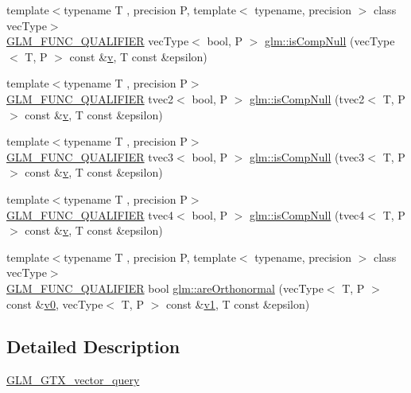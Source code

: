 \begin{DoxyCompactItemize}
\item 
{\footnotesize template$<$typename T , precision P, template$<$ typename, precision $>$ class vec\+Type$>$ }\\\mbox{\hyperlink{setup_8hpp_a33fdea6f91c5f834105f7415e2a64407}{G\+L\+M\+\_\+\+F\+U\+N\+C\+\_\+\+Q\+U\+A\+L\+I\+F\+I\+ER}} vec\+Type$<$ bool, P $>$ \mbox{\hyperlink{group__gtx__vector__query_ga93ecd4137480483ce1af0de8bbbf6546}{glm\+::is\+Comp\+Null}} (vec\+Type$<$ T, P $>$ const \&\mbox{\hyperlink{glad_8h_a14cfbe2fc2234f5504618905b69d1e06}{v}}, T const \&epsilon)
\item 
{\footnotesize template$<$typename T , precision P$>$ }\\\mbox{\hyperlink{setup_8hpp_a33fdea6f91c5f834105f7415e2a64407}{G\+L\+M\+\_\+\+F\+U\+N\+C\+\_\+\+Q\+U\+A\+L\+I\+F\+I\+ER}} tvec2$<$ bool, P $>$ \mbox{\hyperlink{namespaceglm_afc1ffd2beb09bb3c683b3606b2540519}{glm\+::is\+Comp\+Null}} (tvec2$<$ T, P $>$ const \&\mbox{\hyperlink{glad_8h_a14cfbe2fc2234f5504618905b69d1e06}{v}}, T const \&epsilon)
\item 
{\footnotesize template$<$typename T , precision P$>$ }\\\mbox{\hyperlink{setup_8hpp_a33fdea6f91c5f834105f7415e2a64407}{G\+L\+M\+\_\+\+F\+U\+N\+C\+\_\+\+Q\+U\+A\+L\+I\+F\+I\+ER}} tvec3$<$ bool, P $>$ \mbox{\hyperlink{namespaceglm_a5972ae9ce1c88fcd539f51a218af865f}{glm\+::is\+Comp\+Null}} (tvec3$<$ T, P $>$ const \&\mbox{\hyperlink{glad_8h_a14cfbe2fc2234f5504618905b69d1e06}{v}}, T const \&epsilon)
\item 
{\footnotesize template$<$typename T , precision P$>$ }\\\mbox{\hyperlink{setup_8hpp_a33fdea6f91c5f834105f7415e2a64407}{G\+L\+M\+\_\+\+F\+U\+N\+C\+\_\+\+Q\+U\+A\+L\+I\+F\+I\+ER}} tvec4$<$ bool, P $>$ \mbox{\hyperlink{namespaceglm_ac4b73e500deea02815aa386fe10296c8}{glm\+::is\+Comp\+Null}} (tvec4$<$ T, P $>$ const \&\mbox{\hyperlink{glad_8h_a14cfbe2fc2234f5504618905b69d1e06}{v}}, T const \&epsilon)
\item 
{\footnotesize template$<$typename T , precision P, template$<$ typename, precision $>$ class vec\+Type$>$ }\\\mbox{\hyperlink{setup_8hpp_a33fdea6f91c5f834105f7415e2a64407}{G\+L\+M\+\_\+\+F\+U\+N\+C\+\_\+\+Q\+U\+A\+L\+I\+F\+I\+ER}} bool \mbox{\hyperlink{group__gtx__vector__query_ga89c82bc60e5b84e4489b74c15a134caf}{glm\+::are\+Orthonormal}} (vec\+Type$<$ T, P $>$ const \&\mbox{\hyperlink{glad_8h_a7062a23d1d434121d4a88f530703d06a}{v0}}, vec\+Type$<$ T, P $>$ const \&\mbox{\hyperlink{glad_8h_a0779c3b73f9aa3a0ac5b0139b5d291d9}{v1}}, T const \&epsilon)
\end{DoxyCompactItemize}


\subsection{Detailed Description}
\mbox{\hyperlink{group__gtx__vector__query}{G\+L\+M\+\_\+\+G\+T\+X\+\_\+vector\+\_\+query}} 
